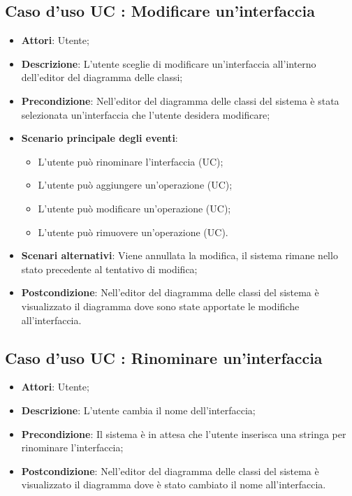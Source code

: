 \documentclass[../AnalisiDeiRequisiti.tex]{subfiles}
\begin{document}
			\subsection{Caso d'uso UC : Modificare un'interfaccia}
			\begin{itemize}
				\item \textbf{Attori}: Utente;
				\item \textbf{Descrizione}: L'utente sceglie di modificare un'interfaccia
				all'interno dell'editor del diagramma delle classi;
				\item \textbf{Precondizione}: Nell'editor del diagramma delle classi del
				sistema è stata selezionata un'interfaccia che l'utente desidera modificare;
				\item \textbf{Scenario principale degli eventi}:
				\begin{itemize}
					\item L'utente può rinominare l'interfaccia (UC);
					\item L'utente può aggiungere un'operazione (UC);
					\item L'utente può modificare un'operazione (UC);
					\item L'utente può rimuovere un'operazione (UC).
				\end{itemize}
				\item \textbf{Scenari alternativi}: Viene annullata la modifica, il sistema
				rimane nello stato precedente al tentativo di modifica;
				\item \textbf{Postcondizione}: Nell'editor del diagramma delle classi del
				sistema è visualizzato il diagramma dove sono state apportate le modifiche
				all'interfaccia.
			\end{itemize}
			\subsection{Caso d'uso UC : Rinominare un'interfaccia}
			\begin{itemize}
				\item \textbf{Attori}: Utente;
				\item \textbf{Descrizione}: L'utente cambia il nome dell'interfaccia;
				\item \textbf{Precondizione}: Il sistema è in attesa che l'utente inserisca
				una stringa per rinominare l'interfaccia;
				\item \textbf{Postcondizione}: Nell'editor del diagramma delle classi del
				sistema è visualizzato il diagramma dove è stato cambiato il nome
				all'interfaccia.
			\end{itemize}
			
\end{document}
